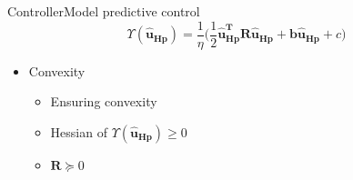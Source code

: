 \begin{frame}{Controller}{Model predictive control}
\begin{equation}
	\Upsilon(\pmb{\hat{u}_{Hp}}) = \frac{1}{\eta}\bigg( \frac{1}{2} \pmb{\hat{u}_{{Hp}}^{T}} \pmb{R} \pmb{\hat{u}_{Hp}} + \pmb{b} \pmb{\hat{u}_{Hp}} + c \bigg)
\end{equation}
\begin{itemize}
	\item<1-> Convexity 
	 	\begin{itemize}
	 	\item<1-> Ensuring convexity 
	 	\item<1-> Hessian of $\Upsilon(\pmb{\hat{u}_{Hp}}) \ge 0$ 
	 	\item<1-> $\pmb{R} \succeq 0$
	 	\end{itemize}
\end{itemize}
\end{frame}